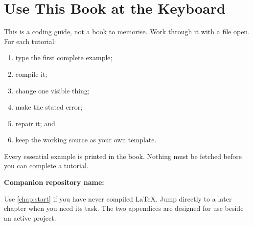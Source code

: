 \chapter*{Use This Book at the Keyboard}

This is a coding guide, not a book to memorise. Work through it with a
 file open. For each tutorial:

\begin{enumerate}
  \item type the first complete example;
  \item compile it;
  \item change one visible thing;
  \item make the stated error;
  \item repair it; and
  \item keep the working source as your own template.
\end{enumerate}

Every essential example is printed in the book. Nothing must be fetched before
you can complete a tutorial.

\begin{classroomnote}
\textbf{Companion repository name:}
\end{classroomnote}

Use \cref{chap:start} if you have never compiled \LaTeX{}. Jump directly to a
later chapter when you need its task. The two appendices are designed for use
beside an active project.
